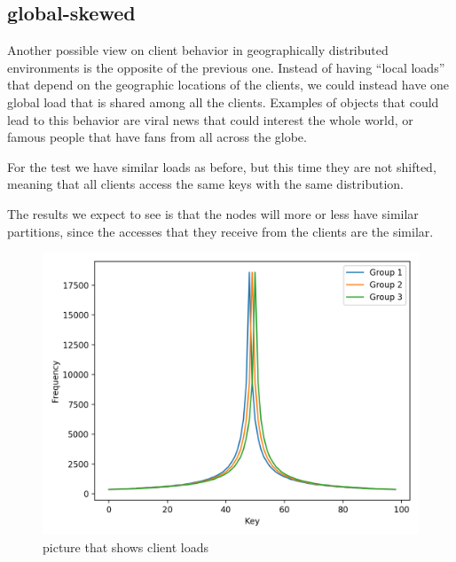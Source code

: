 \subsection{global-skewed}\label{sec:global-skewed}
Another possible view on client behavior in geographically distributed environments is the opposite of the previous one. Instead of having ``local loads'' that depend on the geographic locations of the clients, we could instead have one global load that is shared among all the clients. Examples of objects that could lead to this behavior are viral news that could interest the whole world, or famous people that have fans from all across the globe.

For the test we have similar loads as before, but this time they are not shifted, meaning that all clients access the same keys with the same distribution. 

The results we expect to see is that the nodes will more or less have similar partitions, since the accesses that they receive from the clients are the similar.

\begin{figure}[!htb]
  \centering
  \includegraphics[width=\textwidth,height=\textheight,keepaspectratio]{img/clients_loads_global.png}
  \caption[caption]{ picture that shows client loads }
  \label{fig:global-skewed-loads}
\end{figure}


